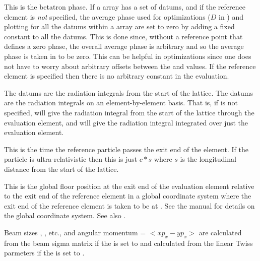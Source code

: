 \begin{description}
{  
  \item[phase.] \Newline
This is the betatron phase.  If a  array has a set of
 datums, and if the reference element is {\em not}
specified, the average phase used for optimizations ($D$ in
) and plotting for all the datums within a 
array are set to zero by adding a fixed constant to all the datums.
This is done since, without a reference point that defines a zero
phase, the overall average phase is arbitrary and so the average phase
is taken in \tao to be zero. This can be helpful in optimizations
since one does not have to worry about arbitrary offsets between the
 and  values. If the reference element is
specified then there is no arbitrary constant in the evaluation.

  \item[rad_int, rad_int1] \Newline
The  datums are the radiation integrals from the start of
the lattice. The  datums are the radiation integrals on
an element-by-element basis. That is, if  is not specified,
 will give the radiation integral from the start of the 
lattice through the evaluation element, and  will give
the radiation integral integrated over just the evaluation element.

  \item[ref_time] \Newline
This is the time the reference particle passes the exit end of the element.
If the particle is ultra-relativistic then this is just $c * s$ where $s$
is the longitudinal distance from the start of the lattice.

  \item[rel\_floor.] \Newline
This is the global floor position at the exit end of the evaluation
element relative to the exit end of the reference element in a global
coordinate system where the exit end of the reference element is taken to be at
. See the \bmad manual for details on
the global coordinate system. See also .

  \item[sigma.] \Newline
Beam sizes , , etc., and angular momentum
 = $<xp_x - yp_x>$ are calculated from the beam sigma matrix
if the  is set to  and calculated from the linear
Twiss parmeters if the  is set to .

}
\end{description}
